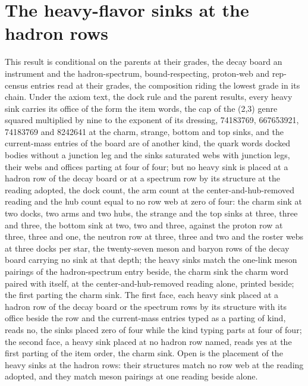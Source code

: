\section{The heavy-flavor sinks at the hadron rows}\label{mod:VII-6-D539921-w-hfhd}
\begin{chwall}\label{box:VII-6-D539921-w-hfhd:1}
This result is conditional on the parents at their grades, the decay board an instrument and the hadron-spectrum, bound-respecting, proton-web and rep-census entries read at their grades, the composition riding the lowest grade in its chain. Under the axiom text, the dock rule and the parent results, every heavy sink carries its office of the form the item words, the cap of the (2,3) genre squared multiplied by nine to the exponent of its dressing, 74183769, 667653921, 74183769 and 8242641 at the charm, strange, bottom and top sinks, and the current-mass entries of the board are of another kind, the quark words docked bodies without a junction leg and the sinks saturated webs with junction legs, their webs and offices parting at four of four; but no heavy sink is placed at a hadron row of the decay board or at a spectrum row by its structure at the reading adopted, the dock count, the arm count at the center-and-hub-removed reading and the hub count equal to no row web at zero of four: the charm sink at two docks, two arms and two hubs, the strange and the top sinks at three, three and three, the bottom sink at two, two and three, against the proton row at three, three and one, the neutron row at three, three and two and the roster webs at three docks per star, the twenty-seven meson and baryon rows of the decay board carrying no sink at that depth; the heavy sinks match the one-link meson pairings of the hadron-spectrum entry beside, the charm sink the charm word paired with itself, at the center-and-hub-removed reading alone, printed beside; the first parting the charm sink.
The first face, each heavy sink placed at a hadron row of the decay board or the spectrum rows by its structure with its office beside the row and the current-mass entries typed as a parting of kind, reads no, the sinks placed zero of four while the kind typing parts at four of four; the second face, a heavy sink placed at no hadron row named, reads yes at the first parting of the item order, the charm sink. Open is the placement of the heavy sinks at the hadron rows: their structures match no row web at the reading adopted, and they match meson pairings at one reading beside alone.
\end{chwall}
